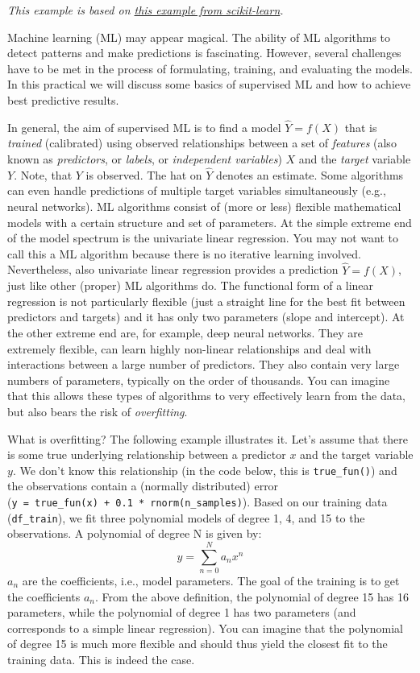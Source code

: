 \documentclass[
]{book}
\begin{document}
\emph{This example is based on \href{https://scikit-learn.org/stable/auto_examples/model_selection/plot_underfitting_overfitting.html}{this example from scikit-learn}.}

Machine learning (ML) may appear magical. The ability of ML algorithms to detect patterns and make predictions is fascinating. However, several challenges have to be met in the process of formulating, training, and evaluating the models. In this practical we will discuss some basics of supervised ML and how to achieve best predictive results.

In general, the aim of supervised ML is to find a model \(\hat{Y} = f(X)\) that is \emph{trained} (calibrated) using observed relationships between a set of \emph{features} (also known as \emph{predictors}, or \emph{labels}, or \emph{independent variables}) \(X\) and the \emph{target} variable \(Y\). Note, that \(Y\) is observed. The hat on \(\hat{Y}\) denotes an estimate. Some algorithms can even handle predictions of multiple target variables simultaneously (e.g., neural networks). ML algorithms consist of (more or less) flexible mathematical models with a certain structure and set of parameters. At the simple extreme end of the model spectrum is the univariate linear regression. You may not want to call this a ML algorithm because there is no iterative learning involved. Nevertheless, also univariate linear regression provides a prediction \(\hat{Y} = f(X)\), just like other (proper) ML algorithms do. The functional form of a linear regression is not particularly flexible (just a straight line for the best fit between predictors and targets) and it has only two parameters (slope and intercept). At the other extreme end are, for example, deep neural networks. They are extremely flexible, can learn highly non-linear relationships and deal with interactions between a large number of predictors. They also contain very large numbers of parameters, typically on the order of thousands. You can imagine that this allows these types of algorithms to very effectively learn from the data, but also bears the risk of \emph{overfitting}.

What is overfitting? The following example illustrates it. Let's assume that there is some true underlying relationship between a predictor \(x\) and the target variable \(y\). We don't know this relationship (in the code below, this is \texttt{true\_fun()}) and the observations contain a (normally distributed) error (\texttt{y\ =\ true\_fun(x)\ +\ 0.1\ *\ rnorm(n\_samples)}). Based on our training data (\texttt{df\_train}), we fit three polynomial models of degree 1, 4, and 15 to the observations. A polynomial of degree N is given by: \[
y = \sum_{n=0}^N a_n x^n
\] \(a_n\) are the coefficients, i.e., model parameters. The goal of the training is to get the coefficients \(a_n\). From the above definition, the polynomial of degree 15 has 16 parameters, while the polynomial of degree 1 has two parameters (and corresponds to a simple linear regression). You can imagine that the polynomial of degree 15 is much more flexible and should thus yield the closest fit to the training data. This is indeed the case.
\end{document}
